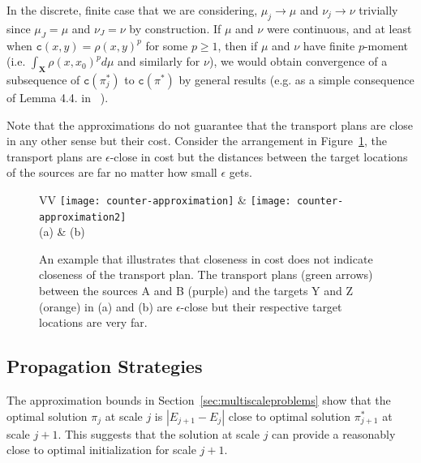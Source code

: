 \documentclass[twoside,11pt]{article}
\newcommand{\cost}[0]{\mathtt{c}}
\newcommand{\coupling}[0]{\pi}
\newcommand{\Xsp}{{\mathbf{X}}}
\begin{document}

In the discrete, finite case that we are considering, $\mu_j\rightarrow\mu$ and
$\nu_j\rightarrow\nu$ trivially since $\mu_J=\mu$ and $\nu_J=\nu$ by
construction. If $\mu$ and $\nu$ were continuous, and at least when
$\cost(x,y)=\rho(x,y)^p$ for some $p\ge1$, then if $\mu$ and $\nu$ have finite
$p$-moment (i.e. $\int_\Xsp \rho(x,x_0)^pd\mu$ and similarly for $\nu$), we
would obtain convergence of a subsequence of $\cost(\coupling^*_j)$ to $\cost(\coupling^*)$ by
general results (e.g. as a simple consequence of Lemma 4.4. in ~\citep{villani:book2009}).

Note that the approximations do not guarantee that the transport plans are
close in any other sense but their cost. Consider the arrangement in
Figure~\ref{fig:counter-approximation}, the transport plans are
$\epsilon$-close in cost but the distances between the target locations of the
sources are far no matter how small $\epsilon$ gets.  
\begin{figure}[thb]
\centering
\begin{tabular}{VV}
\texttt{[image: counter-approximation]} &
\texttt{[image: counter-approximation2]} \\
                      (a) & (b)  
\end{tabular}
  \vspace{-0.1in}
\caption{
\label{fig:counter-approximation}
An example that illustrates that closeness in cost does not indicate closeness
of the transport plan. The transport plans (green arrows) between the sources A
and B (purple) and the targets Y and Z (orange)  in (a) and (b) are
$\epsilon$-close but their respective target locations are very far.  } 
\end{figure}




\subsection{Propagation Strategies}
\label{sec:propagation}
The approximation bounds in Section~\ref{sec:multiscaleproblems} show that the
optimal solution $\coupling_{j}$ at scale $j$ is $| E_{j+1} - E_j |$ close to
optimal solution $\coupling_{j+1}^*$ at scale $j+1$. This suggests that the
solution at scale $j$ can provide a reasonably close to optimal initialization
for scale $j+1$.  
\end{document}
